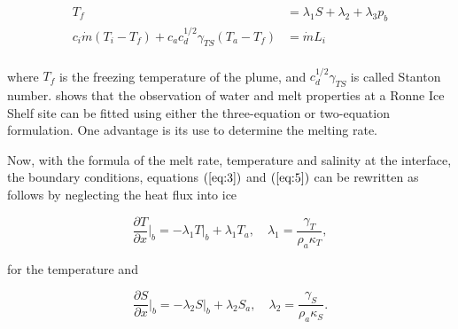 \documentclass[11pt,a4paper]{article}
\begin{document}
	\begin{align}
			T_f & = \lambda_1 S+\lambda_2+\lambda_3p_b\\
			c_i\dot{m}\left(T_i-T_f\right) + c_a c_d^{1/2}\gamma_{TS}(T_a-T_f)& = \dot{m}L_i\\
	\end{align}
	
	\noindent where $T_f$ is the freezing temperature of the plume, and $c_d^{1/2}\gamma_{TS}$ is called Stanton number. \cite{jenkins2010observation} shows that the observation of water and melt properties at a Ronne Ice Shelf site can be fitted using either the three-equation or two-equation formulation.
	One advantage is its use to determine the melting rate.
	

	
	Now, with the formula of the melt rate, temperature and salinity at the interface, the boundary conditions, equations $(\ref{eq:3})$ and $(\ref{eq:5})$ can be rewritten as follows by neglecting the heat flux into ice
	
	\begin{equation}
		\label{eq:eq10}
		\dfrac{\partial T}{\partial x}\bigg|_b = -\lambda_1T\bigg|_b + \lambda_1T_a, \quad \lambda_1 = \dfrac{\gamma_T}{\rho_a\kappa_T},
	\end{equation}
	
	\noindent for the temperature and 
	
	\begin{equation}
		\label{eq:eq11}
		\dfrac{\partial S}{\partial x}\bigg|_b = -\lambda_2S\bigg|_b + \lambda_2S_a, \quad \lambda_2 = \dfrac{\gamma_S}{\rho_a\kappa_S}.
	\end{equation}
	
\end{document}
